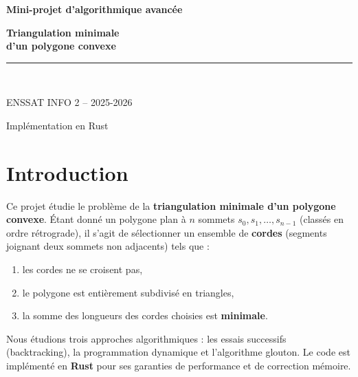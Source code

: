 \documentclass[12pt,a4paper]{article}
\begin{document}
\begin{titlepage}
  \centering
  \vspace*{3cm}
  {\LARGE\bfseries Mini-projet d'algorithmique avancée\par}
  \vspace{1cm}
  {\Huge\bfseries Triangulation minimale\\[0.3em]d'un polygone convexe\par}
  \vspace{2cm}
  \rule{0.6\textwidth}{0.4pt}\\[1em]
  {\large ENSSAT INFO 2 -- 2025-2026\par}
  \vfill
  {\normalsize Implémentation en Rust\par}
  \vspace{1cm}
\end{titlepage}

\tableofcontents
\newpage

\section{Introduction}

Ce projet étudie le problème de la \textbf{triangulation minimale d'un polygone convexe}.
Étant donné un polygone plan à $n$ sommets $s_0, s_1, \ldots, s_{n-1}$ (classés en ordre
rétrograde), il s'agit de sélectionner un ensemble de \textbf{cordes} (segments joignant
deux sommets non adjacents) tels que :

\begin{enumerate}
  \item les cordes ne se croisent pas,
  \item le polygone est entièrement subdivisé en triangles,
  \item la somme des longueurs des cordes choisies est \textbf{minimale}.
\end{enumerate}

Nous étudions trois approches algorithmiques : les essais successifs (backtracking),
la programmation dynamique et l'algorithme glouton. Le code est implémenté en
\textbf{Rust} pour ses garanties de performance et de correction mémoire.
\end{document}

